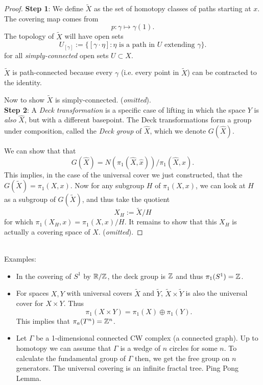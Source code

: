 \documentclass{amsart}
\begin{document}
	 \begin{proof}
	 	\textbf{Step 1}: We define $\tilde{X}$ as the set of homotopy classes of paths starting at $x$. The covering map comes from
	 	$$
	 	p: \gamma \mapsto \gamma(1).
	 	$$
	 	The topology of $\tilde{X}$ will have open sets 
	 	$$
	 	U_{[\gamma]} := \{[\gamma \cdot \eta] : \eta \text{ is a path in $U$ extending $\gamma$}\}.
	 	$$
	 	for all \textit{simply-connected} open sets $U\subset X$.
	 	
	 	$\tilde{X}$ is path-connected because every $\gamma$ (i.e. every point in $\tilde{X}$) can be contracted to the identity.
	 	
	 	Now to show $\tilde{X}$ is simply-connected. (\textit{omitted}).\\
	 	
	 	\textbf{Step 2}: A \textit{Deck transformation} is a specific case of lifting in which the space $Y$ is \textit{also} $\hat{X}$, but with a different basepoint. The Deck transformations form a group under composition, called the \textit{Deck group} of $\hat{X}$, which we denote $G(\hat{X})$.
	 	
	 	We can show that that 
	 	$$G(\hat{X}) = N(\pi_1(\hat{X},\hat{x}))/\pi_1(\hat{X},\hat{x}).$$ This implies, in the case of the universal cover we just constructed, that the $G(\tilde{X}) = \pi_1(X,x)$. Now for any subgroup $H$ of $\pi_1(X,x)$, we can look at $H$ as a subgroup of $G(\tilde{X})$, and thus take the quotient 
	 	$$
	 	X_H := \tilde{X}/H
	 	$$ 
	 	for which $\pi_1(X_H,x)=\pi_1(X,x)/H$. It remains to show that this $X_H$ is actually a covering space of $X$. (\textit{omitted}).
	 \end{proof}\\
	 
	 Examples:
	 \begin{itemize}
	 	\item In the covering of $S^1$ by $\mathbb{R}/\mathbb{Z}$, the deck group is $\mathbb{Z}$ and thus $\pi_1(S^1)=\mathbb{Z}$.
	 	\item For spaces $X,Y$ with universal covers $\tilde{X}$ and $\tilde{Y}$, $\tilde{X}\times \tilde{Y}$ is also the universal cover for $X\times Y$. Thus 
	 	$$
	 	\pi_1(X\times Y)= \pi_1(X)\oplus \pi_1(Y).
	 	$$
	 	This implies that $\pi_a(T^n)=\mathbb{Z}^n$.
	 	\item Let $\Gamma$ be a 1-dimensional connected CW complex (a connected graph). Up to homotopy we can assume that $\Gamma$ is a wedge of $n$ circles for some $n$. To calculate the fundamental group of $\Gamma$ then, we get the free group on $n$ generators. The universal covering is an infinite fractal tree. Ping Pong Lemma.
	 \end{itemize}
	 
\end{document}
